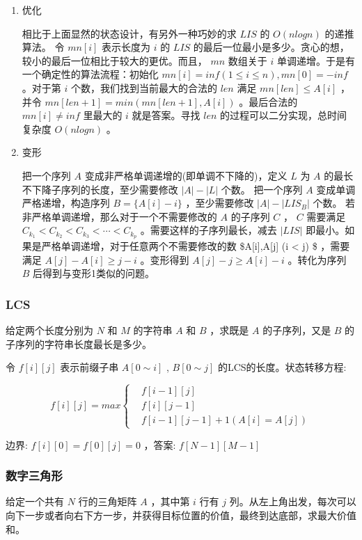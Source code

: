\documentclass[11pt]{article}
\begin{document}
\begin{enumerate}
\item 优化
\label{sec-2-3-1-1}

相比于上面显然的状态设计，有另外一种巧妙的求 $LIS$ 的 $O(nlogn)$ 的递推算法。
令 $mn[i]$ 表示长度为 $i$ 的 $LIS$ 的最后一位最小是多少。贪心的想，较小的最后一位相比于较大的更优。而且， $mn$ 数组关于 $i$ 单调递增。于是有一个确定性的算法流程：初始化 $mn[i]=inf(1 \leq i \leq n),mn[0]=-inf$ 。对于第 $i$ 个数，我们找到当前最大的合法的 $len$ 满足 $mn[len] \leq A[i]$ ，并令 $mn[len+1]=min(mn[len+1],A[i])$ 。最后合法的 $mn[i] \neq inf$ 里最大的 $i$ 就是答案。寻找 $len$ 的过程可以二分实现，总时间复杂度 $O(nlogn)$ 。

\item 变形
\label{sec-2-3-1-2}

把一个序列 $A$ 变成非严格单调递增的(即单调不下降的)，定义 $L$ 为 $A$ 的最长不下降子序列的长度，至少需要修改 $|A|-|{L}|$ 个数。
把一个序列 $A$ 变成单调严格递增，构造序列 $B=\{A[i]-i\}$ ，至少需要修改 $|A|-|{LIS_B}|$ 个数。
若非严格单调递增，那么对于一个不需要修改的 $A$ 的子序列 $C$ ， $C$  需要满足 $C_{k_1} < C_{k_2} < C_{k_3} < \cdots < C_{k_p}$ 。需要这样的子序列最长，减去 $|LIS|$ 即最小。如果是严格单调递增，对于任意两个不需要修改的数 \$A[i],A[j] (i < j) \$ ，需要满足 $A[j]-A[i] \geq j-i$ 。变形得到 $A[j]-j \geq A[i]-i$ 。转化为序列 $B$ 后得到与变形1类似的问题。
\end{enumerate}
\subsubsection{LCS}
\label{sec-2-3-2}

给定两个长度分别为 $N$ 和 $M$ 的字符串 $A$ 和 $B$ ，求既是 $A$ 的子序列，又是 $B$ 的子序列的字符串长度最长是多少。

令 $f[i][j]$ 表示前缀子串 $A[0 \sim i]$ , $B[0 \sim j]$ 的LCS的长度。状态转移方程:

$$ 
f[i][j]=max\left\{\begin{aligned}
&f[i-1][j]\\
&f[i][j-1]\\
&f[i-1][j-1]+1 (A[i]=A[j])
\end{aligned}\right. 
$$

边界: $f[i][0]=f[0][j]=0$ ，答案: $f[N-1][M-1]$ 
\subsubsection{数字三角形}
\label{sec-2-3-3}

给定一个共有 $N$ 行的三角矩阵 $A$ ，其中第 $i$ 行有 $j$ 列。从左上角出发，每次可以向下一步或者向右下方一步，并获得目标位置的价值，最终到达底部，求最大价值和。
\end{document}
